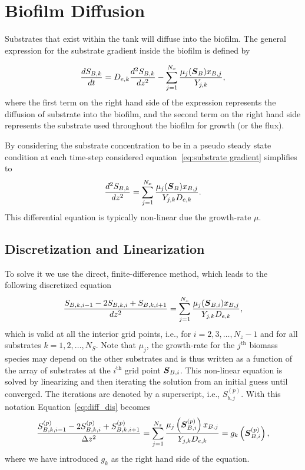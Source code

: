\documentclass[letterpaper, twoside]{article}
\numberwithin{equation}{section}
\newcommand{\ie}{i.e.}
\def\bm#1{\mbox{\boldmath{$#1$}}}
\begin{document}
\section{Biofilm Diffusion}
Substrates that exist within the tank will diffuse into the biofilm. The general expression for the substrate gradient inside the biofilm is defined by

\begin{equation} \label{eq:substrate gradient}
\frac{dS_{B,k}}{dt} = D_{e,k} \frac{d^2S_{B,k}}{dz^2} - \sum_{j=1}^{N_x}\frac{\mu_j(\bm{S}_B) x_{B,j}}{Y_{j,k}},
\end{equation}
where the first term on the right hand side of the expression represents the diffusion of substrate into the biofilm, and the second term on the right hand side represents the substrate used throughout the biofilm for growth (or the flux).

By considering the substrate concentration to be in a pseudo steady state condition at each time-step considered equation~\ref {eq:substrate gradient} simplifies to 
\begin{equation} \label{eq:diffusion}
  \frac{d^2 S_{B,k}}{dz^2} = \sum_{j=1}^{N_x}\frac{\mu_j(\bm{S}_B) x_{B,j}}{Y_{j,k} D_{e,k}}.
\end{equation}
This differential equation is typically non-linear due the growth-rate $\mu$.

\subsection{Discretization and Linearization}
To solve it we use the direct, finite-difference method, which leads to the following discretized equation
\begin{equation} \label{eq:diff_dis}
  \frac{ S_{B,k,i-1} - 2 S_{B,k,i} + S_{B,k,i+1}}{dz^2} = \sum_{j=1}^{N_x}\frac{\mu_j(\bm{S}_{B,i}) x_{B,j}}{Y_{j,k} D_{e,k}},
\end{equation}
which is valid at all the interior grid points, \ie, for $i=2,3,\dots,N_z-1$ and for all substrates $k=1,2,\dots,N_S$.
Note that $\mu_j$, the growth-rate for the $j^\mathrm{th}$ biomass species may depend on the other substrates and is thus written as a function of the array of substrates at the $i^\mathrm{th}$ grid point $\bm{S}_{B,i}$.
This non-linear equation is solved by linearizing and then iterating the solution from an initial guess until converged.
The iterations are denoted by a superscript, \ie, $S_{b,j}^{(p)}$.  With this notation Equation~\ref{eq:diff_dis} becomes
\begin{equation} \label{eq:diff_dis_iter}
  \frac{ S_{B,k,i-1}^{(p)} - 2 S_{B,k,i}^{(p)} + S_{B,k,i+1}^{(p)}}{\Delta z^2} = \sum_{j=1}^{N_x} \frac{\mu_j\left(\bm{S}_{B,i}^{(p)}\right) x_{B,j}}{Y_{j,k} D_{e,k}} =  g_k\left(\bm{S}_{B,i}^{(p)}\right),
\end{equation}
where we have introduced $g_k$ as the right hand side of the equation.
\end{document}
